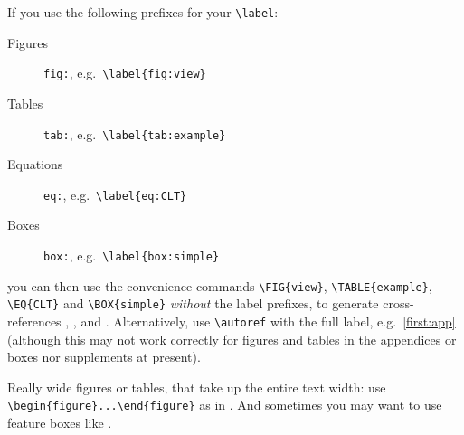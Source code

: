 \documentclass[9pt,bestpractices]{livecoms}
\begin{document}
If you use the following prefixes for your \verb|\label|:
%
\begin{description}
\item[Figures] \texttt{fig:}, e.g.~\verb|\label{fig:view}|
\item[Tables] \texttt{tab:}, e.g.~\verb|\label{tab:example}|
\item[Equations] \texttt{eq:}, e.g.~\verb|\label{eq:CLT}|
\item[Boxes] \texttt{box:}, e.g.~\verb|\label{box:simple}|
\end{description}
%
you can then use the convenience commands \verb|\FIG{view}|, \verb|\TABLE{example}|, \verb|\EQ{CLT}| and \verb|\BOX{simple}| \emph{without} the label prefixes, to generate cross-references , ,  and . Alternatively, use \verb|\autoref| with the full label, e.g.~\autoref{first:app} (although this may not work correctly for figures and tables in the appendices or boxes nor supplements at present).

Really wide figures or tables, that take up the entire text width: use \verb|\begin{figure}...\end{figure}| as in . And sometimes you may want to use feature boxes like .
\end{document}
